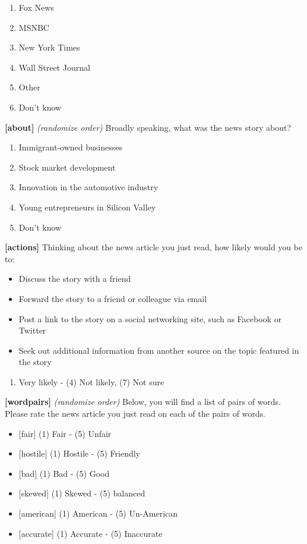 \documentclass[]{article}
\providecommand{\tightlist}{%
  \setlength{\itemsep}{0pt}\setlength{\parskip}{0pt}}
\begin{document}
\begin{enumerate}
\def\labelenumi{\arabic{enumi}.}
\tightlist
\item
  Fox News
\item
  MSNBC
\item
  New York Times
\item
  Wall Street Journal
\item
  Other
\item
  Don't know
\end{enumerate}

\textbf{{[}about{]}} \emph{(randomize order)} Broadly speaking, what was
the news story about?

\begin{enumerate}
\def\labelenumi{\arabic{enumi}.}
\tightlist
\item
  Immigrant-owned businesses
\item
  Stock market development
\item
  Innovation in the automotive industry
\item
  Young entrepreneurs in Silicon Valley
\item
  Don't know
\end{enumerate}

\textbf{{[}actions{]}} Thinking about the news article you just read,
how likely would you be to:

\begin{itemize}
\tightlist
\item
  Discuss the story with a friend
\item
  Forward the story to a friend or colleague via email
\item
  Post a link to the story on a social networking site, such as Facebook
  or Twitter
\item
  Seek out additional information from another source on the topic
  featured in the story
\end{itemize}

\begin{enumerate}
\def\labelenumi{(\arabic{enumi})}
\tightlist
\item
  Very likely - (4) Not likely, (7) Not sure
\end{enumerate}

\textbf{{[}wordpairs{]}} \emph{(randomize order)} Below, you will find a
list of pairs of words. Please rate the news article you just read on
each of the pairs of words.

\begin{itemize}
\tightlist
\item
  {[}fair{]} (1) Fair - (5) Unfair
\item
  {[}hostile{]} (1) Hostile - (5) Friendly
\item
  {[}bad{]} (1) Bad - (5) Good
\item
  {[}skewed{]} (1) Skewed - (5) balanced
\item
  {[}american{]} (1) American - (5) Un-American
\item
  {[}accurate{]} (1) Accurate - (5) Inaccurate
\end{itemize}
\end{document}
